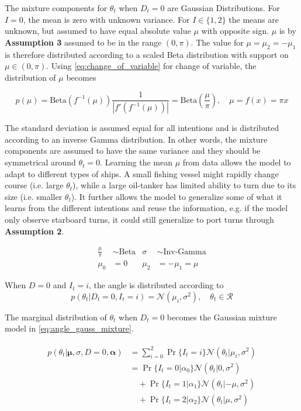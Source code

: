 The mixture components for $\theta_t$ when $D_t=0$ are Gaussian Distributions. For $I=0$, the mean is zero with unknown variance. For $I \in \{1, 2\}$ the means are unknown, but assumed to have equal absolute value $\mu$ with opposite sign. $\mu$ is by \textbf{Assumption 3} assumed to be in the range $(0, \pi)$. The value for $\mu = \mu_2 = -\mu_1$ is therefore distributed according to a scaled Beta distribution with support on $\mu \in (0, \pi)$.  Using \cref{eq:change_of_variable} for change of variable, the distribution of $\mu$ becomes 

\begin{equation}\label{eq:prior_mu}
    p(\mu) = \text{Beta}(f^{-1}(\mu)) \frac{1}{|f'(f^{-1}(\mu))|}  = \text{Beta}(\frac{\mu}{\pi}), \quad \mu = f(x) = \pi x
\end{equation}

The standard deviation is assumed equal for all intentions and is distributed according to an inverse Gamma distribution. In other words, the mixture components are assumed to have the same variance and they should be symmetrical around $\theta_t=0$.
Learning the mean $\mu$ from data allows the model to adapt to different types of ships. A small fishing vessel might rapidly change course (i.e. large $\theta_t$), while a large oil-tanker has limited ability to turn due to its size (i.e. smaller $\theta_t$). It further allows the model to generalize some of what it learns from the different intentions and reuse the information, e.g. if the model only observe starboard turns, it could still generalize to port turns through \textbf{Assumption 2}. 

\begin{align}
     \frac{\mu}{\pi} &\sim \text{Beta} & \sigma &\sim \text{Inv-Gamma} \\
     \mu_0 &= 0 & \mu_{2} &= -\mu_{1} = \mu
\end{align}

When $D=0$ and $I_t=i$, the angle is distributed according to
\begin{equation}\label{eq:theta_intention_mixture}
    p(\theta_t | D_t=0, I_t=i) = \mathcal{N}(\mu_i, \sigma^2), \quad \theta_t \in \mathcal{R}
\end{equation}

The marginal distribution of $\theta_t$ when $D_t=0$ becomes the Gaussian mixture model in \cref{eq:angle_gauss_mixture}.

\begin{align}\label{eq:angle_gauss_mixture}
\begin{split}
    p(\theta_t | \boldsymbol{\mu}, \sigma, D=0, \boldsymbol{\alpha}) &= \sum_{i=0}^2 \Pr\{I_t=i\}\mathcal{N}(\theta_t | \mu_i, \sigma^2) \\
    &=\Pr\{I_t=0 | \alpha_0\}\mathcal{N}(\theta_t | 0, \sigma^2)\\
    &\quad+\Pr\{I_t=1 | \alpha_1\}\mathcal{N}(\theta_t | -\mu, \sigma^2)\\
    &\quad+\Pr\{I_t=2 | \alpha_2\}\mathcal{N}(\theta_t | \mu, \sigma^2)
\end{split}
\end{align}

